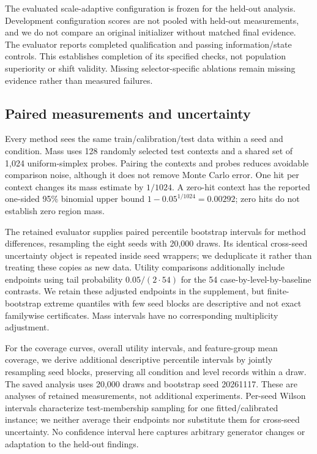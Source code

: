 \documentclass{article}
\begin{document}
The evaluated scale-adaptive configuration is frozen for the held-out analysis. Development configuration scores are not pooled with held-out measurements, and we do not compare an original initializer without matched final evidence. The evaluator reports completed qualification and passing information/state controls. This establishes completion of its specified checks, not population superiority or shift validity. Missing selector-specific ablations remain missing evidence rather than measured failures. %

\subsection{Paired measurements and uncertainty}
Every method sees the same train/calibration/test data within a seed and condition. Mass uses 128 randomly selected test contexts and a shared set of 1,024 uniform-simplex probes. Pairing the contexts and probes reduces avoidable comparison noise, although it does not remove Monte Carlo error. One hit per context changes its mass estimate by $1/1024$. A zero-hit context has the reported one-sided 95\% binomial upper bound $1-0.05^{1/1024}=0.00292$; zero hits do not establish zero region mass. %

The retained evaluator supplies paired percentile bootstrap intervals for method differences, resampling the eight seeds with 20,000 draws. Its identical cross-seed uncertainty object is repeated inside seed wrappers; we deduplicate it rather than treating these copies as new data. Utility comparisons additionally include endpoints using tail probability $0.05/(2\cdot54)$ for the 54 case-by-level-by-baseline contrasts. We retain these adjusted endpoints in the supplement, but finite-bootstrap extreme quantiles with few seed blocks are descriptive and not exact familywise certificates. Mass intervals have no corresponding multiplicity adjustment. %

For the coverage curves, overall utility intervals, and feature-group mean coverage, we derive additional descriptive percentile intervals by jointly resampling seed blocks, preserving all condition and level records within a draw. The saved analysis uses 20,000 draws and bootstrap seed 20261117. These are analyses of retained measurements, not additional experiments. Per-seed Wilson intervals characterize test-membership sampling for one fitted/calibrated instance; we neither average their endpoints nor substitute them for cross-seed uncertainty. No confidence interval here captures arbitrary generator changes or adaptation to the held-out findings. %
\end{document}
